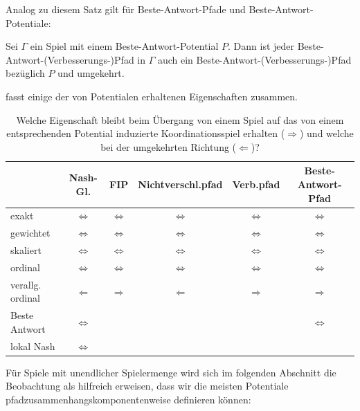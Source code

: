 Analog zu diesem Satz gilt für Beste-Antwort-Pfade und Beste-Antwort-Potentiale:

\begin{satz}\label{prop:BAPotBAPfad}
	Sei $\Gamma$ ein Spiel mit einem Beste-Antwort-Potential $P$. Dann ist jeder Beste-Antwort-(Verbesserungs-)Pfad in $\Gamma$ auch ein Beste-Antwort-(Verbesserungs-)Pfad bezüglich $P$ und umgekehrt.
\end{satz}

 fasst einige der von Potentialen erhaltenen Eigenschaften zusammen.

\begin{table}[h]\centering
	\begin{tabular}{l|ccccc}
						& Nash-Gl. 			& FIP 					& Nichtverschl.pfad 			& Verb.pfad 		& Beste-Antwort-Pfad \\\hline
		exakt			& $\Leftrightarrow$	& $\Leftrightarrow$ 	& $\Leftrightarrow$				& $\Leftrightarrow$	& $\Leftrightarrow$ \\
		gewichtet		& $\Leftrightarrow$	& $\Leftrightarrow$ 	& $\Leftrightarrow$				& $\Leftrightarrow$	& $\Leftrightarrow$ \\		
		skaliert		& $\Leftrightarrow$ & $\Leftrightarrow$ 	& $\Leftrightarrow$				& $\Leftrightarrow$	& $\Leftrightarrow$ \\
		ordinal			& $\Leftrightarrow$	& $\Leftrightarrow$ 	& $\Leftrightarrow$				& $\Leftrightarrow$	& $\Leftrightarrow$ \\
		verallg. ordinal& $\Leftarrow$		& $\Rightarrow$		 	& $\Leftarrow$					& $\Rightarrow$		& $\Rightarrow$ 	\\
		Beste Antwort	& $\Leftrightarrow$	& 					 	& 								& 					& $\Leftrightarrow$ \\
		lokal Nash		& $\Leftrightarrow$	& 					 	& 								& 					& 					
	\end{tabular}	
	\caption{Welche Eigenschaft bleibt beim Übergang von einem Spiel auf das von einem entsprechenden Potential induzierte Koordinationsspiel erhalten ($\Rightarrow$) und welche bei der umgekehrten Richtung ($\Leftarrow$)?\\}\label{tab:PotErhalten}
\end{table}

Für Spiele mit unendlicher Spielermenge wird sich im folgenden Abschnitt die Beobachtung als hilfreich erweisen, dass wir die meisten Potentiale pfadzusammenhangskomponentenweise definieren können:

